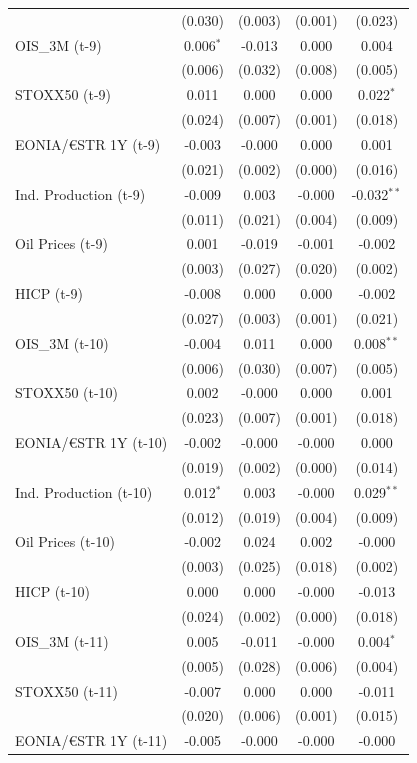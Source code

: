 \begin{longtable}[t]{lcccc}
 & (0.030) & (0.003) & (0.001) & (0.023)\\
OIS\_3M (t-9) & 0.006$^{*}$ & -0.013 & 0.000 & 0.004\\
 & (0.006) & (0.032) & (0.008) & (0.005)\\
STOXX50 (t-9) & 0.011 & 0.000 & 0.000 & 0.022$^{*}$\\
 & (0.024) & (0.007) & (0.001) & (0.018)\\
EONIA/€STR 1Y (t-9) & -0.003 & -0.000 & 0.000 & 0.001\\
 & (0.021) & (0.002) & (0.000) & (0.016)\\
Ind. Production (t-9) & -0.009 & 0.003 & -0.000 & -0.032$^{**}$\\
 & (0.011) & (0.021) & (0.004) & (0.009)\\
Oil Prices (t-9) & 0.001 & -0.019 & -0.001 & -0.002\\
 & (0.003) & (0.027) & (0.020) & (0.002)\\
HICP (t-9) & -0.008 & 0.000 & 0.000 & -0.002\\
 & (0.027) & (0.003) & (0.001) & (0.021)\\
OIS\_3M (t-10) & -0.004 & 0.011 & 0.000 & 0.008$^{**}$\\
 & (0.006) & (0.030) & (0.007) & (0.005)\\
STOXX50 (t-10) & 0.002 & -0.000 & 0.000 & 0.001\\
 & (0.023) & (0.007) & (0.001) & (0.018)\\
EONIA/€STR 1Y (t-10) & -0.002 & -0.000 & -0.000 & 0.000\\
 & (0.019) & (0.002) & (0.000) & (0.014)\\
Ind. Production (t-10) & 0.012$^{*}$ & 0.003 & -0.000 & 0.029$^{**}$\\
 & (0.012) & (0.019) & (0.004) & (0.009)\\
Oil Prices (t-10) & -0.002 & 0.024 & 0.002 & -0.000\\
 & (0.003) & (0.025) & (0.018) & (0.002)\\
HICP (t-10) & 0.000 & 0.000 & -0.000 & -0.013\\
 & (0.024) & (0.002) & (0.000) & (0.018)\\
OIS\_3M (t-11) & 0.005 & -0.011 & -0.000 & 0.004$^{*}$\\
 & (0.005) & (0.028) & (0.006) & (0.004)\\
STOXX50 (t-11) & -0.007 & 0.000 & 0.000 & -0.011\\
 & (0.020) & (0.006) & (0.001) & (0.015)\\
EONIA/€STR 1Y (t-11) & -0.005 & -0.000 & -0.000 & -0.000\\

\end{longtable}
